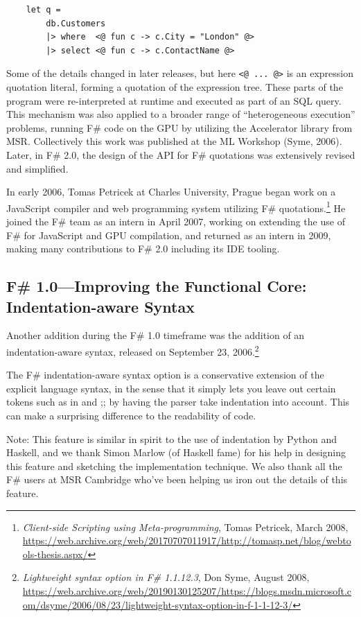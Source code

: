 \documentclass[acmsmall]{acmart}\settopmatter{}
\begin{document}
\begin{verbatim}
    let q =
        db.Customers
        |> where  <@ fun c -> c.City = "London" @> 
        |> select <@ fun c -> c.ContactName @>
\end{verbatim}
Some of the details changed in later releases, but here \verb$<@ ... @>$ is an expression quotation literal, forming a quotation of the expression tree. These parts of the program were re-interpreted at runtime and executed as part of an SQL query.  This mechanism was also applied to a broader range of “heterogeneous execution” problems, running F\# code on the GPU by utilizing the Accelerator library from MSR. Collectively this work was published at the ML Workshop (Syme, 2006). Later, in F\# 2.0, the design of the API for F\# quotations was extensively revised and simplified.

In early 2006, Tomas Petricek at Charles University, Prague began work on a JavaScript compiler and web programming
system utilizing F\# quotations.\footnote{\textit{Client-side Scripting using Meta-programming}, Tomas Petricek, March 2008, \url{https://web.archive.org/web/20170707011917/http://tomasp.net/blog/webtools-thesis.aspx/}}  He
joined the F\# team as an intern in April 2007, working on extending the use of F\# for JavaScript and GPU compilation,
and returned as an intern in 2009, making many contributions to F\# 2.0 including its IDE tooling.

\subsection*{F\# 1.0---Improving the Functional Core: Indentation-aware Syntax}

Another addition during the F\# 1.0 timeframe was the addition of an indentation-aware syntax, released on
September 23, 2006.\footnote{\textit{Lightweight syntax option in F\# 1.1.12.3}, Don Syme, August 2008, \url{https://web.archive.org/web/20190130125207/https://blogs.msdn.microsoft.com/dsyme/2006/08/23/lightweight-syntax-option-in-f-1-1-12-3/}}

\begin{verbquote}
The F# indentation-aware syntax option is a conservative extension of the explicit language syntax, in the sense that it simply lets you leave out certain tokens such as in and ;; by having the parser take indentation into account. This can make a surprising difference to the readability of code. 

Note: This feature is similar in spirit to the use of indentation by Python and Haskell, and we thank Simon Marlow (of Haskell fame) for his help in designing this feature and sketching the implementation technique. We also thank all the F# users at MSR Cambridge who've been helping us iron out the details of this feature. 
\end{verbquote}
\end{document}

